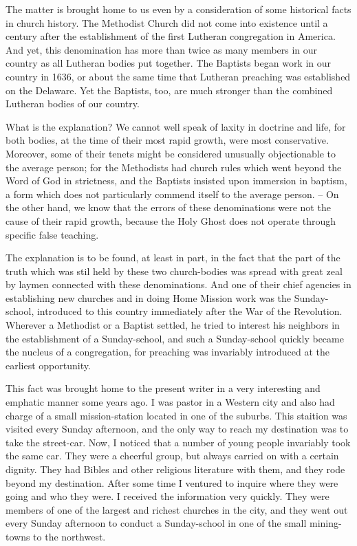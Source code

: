\documentclass[
]{book}
\begin{document}
The matter is brought home to us even by a consideration of some historical facts in church history. The Methodist Church did not come into existence until a century after the establishment of the first Lutheran congregation in America. And yet, this denomination has more than twice as many members in our country as all Lutheran bodies put together. The Baptists began work in our country in 1636, or about the same time that Lutheran preaching was established on the Delaware. Yet the Baptists, too, are much stronger than the combined Lutheran bodies of our country.

What is the explanation? We cannot well speak of laxity in doctrine and life, for both bodies, at the time of their most rapid growth, were most conservative. Moreover, some of their tenets might be considered unusually objectionable to the average person; for the Methodists had church rules which went beyond the Word of God in strictness, and the Baptists insisted upon immersion in baptism, a form which does not particularly commend itself to the average person. -- On the other hand, we know that the errors of these denominations were not the cause of their rapid growth, because the Holy Ghost does not operate through specific false teaching.

The explanation is to be found, at least in part, in the fact that the part of the truth which was stil held by these two church-bodies was spread with great zeal by laymen connected with these denominations. And one of their chief agencies in establishing new churches and in doing Home Mission work was the Sunday-school, introduced to this country immediately after the War of the Revolution. Wherever a Methodist or a Baptist settled, he tried to interest his neighbors in the establishment of a Sunday-school, and such a Sunday-school quickly became the nucleus of a congregation, for preaching was invariably introduced at the earliest opportunity.

This fact was brought home to the present writer in a very interesting and emphatic manner some years ago. I was pastor in a Western city and also had charge of a small mission-station located in one of the suburbs. This staition was visited every Sunday afternoon, and the only way to reach my destination was to take the street-car. Now, I noticed that a number of young people invariably took the same car. They were a cheerful group, but always carried on with a certain dignity. They had Bibles and other religious literature with them, and they rode beyond my destination. After some time I ventured to inquire where they were going and who they were. I received the information very quickly. They were members of one of the largest and richest churches in the city, and they went out every Sunday afternoon to conduct a Sunday-school in one of the small mining-towns to the northwest.
\end{document}
